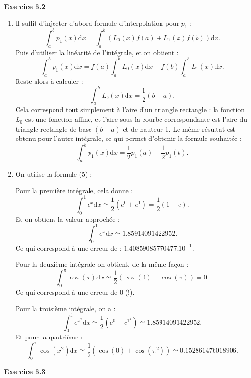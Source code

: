 \documentclass{article}
\begin{document}
{\bf Exercice 6.2}

\begin{enumerate}
    \item Il suffit d'injecter d'abord formule d'interpolation pour $p_1$ :
    \[
    \int_a^b p_1(x) \mathrm{d}x =
    \int_a^b \left ( L_0(x) f(a) + L_1(x) f(b) \right ) \mathrm{d}x. %
    \]
    Puis d'utiliser la linéarité de l'intégrale, et on obtient :
    \[
    \int_a^b p_1(x) \mathrm{d}x =
    f(a) \int_a^b L_0(x) \mathrm{d}x + f(b) \int_a^b L_1(x) \mathrm{d}x.
    \]
    Reste alors à calculer :
    \[
    \int_a^b L_0(x) \mathrm{d}x = \frac12(b-a).
    \]
    Cela correspond tout simplement à l'aire d'un triangle rectangle : la fonction $L_0$ est une fonction affine, et l'aire sous la courbe correspondante est l'aire du triangle rectangle de base $(b-a)$ et de hauteur 1. Le même résultat est obtenu pour l'autre intégrale, ce qui permet d'obtenir la formule souhaitée :
    \[
    \int_a^b p_1(x) \mathrm{d}x =
    \frac12 p_1(a) + \frac12 p_1(b).
    \]
    
    \item On utilise la formule (5) :
    
    Pour la première intégrale, cela donne : 
    \[
    \int_0^1 e^x \mathrm{d}x \simeq 
    \frac12 ( e^0 + e^1 ) = \frac12 ( 1 + e ).
    \]
    Et on obtient la valeur approchée :
    \[
    \int_0^1 e^x \mathrm{d}x \simeq 1.85914091422952.
    \]
    Ce qui correspond à une erreur de : $1.40859085770477.10^{-1}$.
    
    Pour la deuxième intégrale on obtient, de la même façon :
    \[
    \int_0^\pi \cos(x) \mathrm{d}x 
    \simeq \frac12 (\cos(0) + \cos(\pi)) = 0. 
    \]
    Ce qui correspond à une erreur de  $0$ (!).

Pour la troisième intégrale, on a :
    \[
    \int_0^1 e^{x^2} \mathrm{d}x 
    \simeq \frac12 ( e^0 + e^{1^2} )
    \simeq 1.85914091422952.
    \]
Et pour la quatrième :
    \[
    \int_0^\pi \cos(x^2) \mathrm{d}x \simeq 
    \frac12 ( \cos(0) + \cos(\pi^2) )
    \simeq
    0.152861476018906. 
    \]

\end{enumerate}

{\bf Exercice 6.3}
\end{document}
